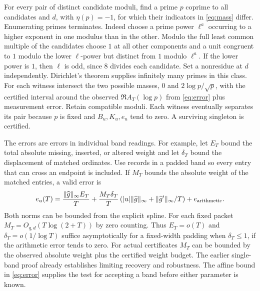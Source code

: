 \documentclass[11pt]{article}
\begin{document}
For every pair of distinct candidate moduli, find a prime $p$ coprime to
all candidates and $d$, with $\eta(p)=-1$, for which their
indicators in \eqref{eq:mass} differ. Enumerating primes terminates.
Indeed choose a prime power $\ell^a$ occurring to a higher exponent in one
modulus than in the other. Modulo the full least common multiple of the
candidates choose $1$ at all other components and a unit congruent to $1$
modulo the lower $\ell$-power but distinct from $1$ modulo $\ell^a$.
If the lower power is $1$, then $\ell$ is odd, since $8$ divides each
candidate. Set a nonresidue at $d$ independently. Dirichlet's theorem
supplies infinitely many primes in this class.
For each witness intersect the two possible masses, $0$ and
$2\log p/\sqrt p$, with the certified interval around the observed
$\Re A_T(\log p)$ from \eqref{eq:error} plus measurement error. Retain
compatible moduli. Each witness eventually separates its pair because $p$
is fixed and $B_u,K_u,e_u$ tend to zero. A surviving singleton is certified.

The errors are errors in individual band readings. For example, let
$E_T$ bound the total absolute missing, inserted, or altered weight and
let $\delta_T$ bound the displacement of matched ordinates. Use records
in a padded band so every entry that can cross an endpoint is included.
If $M_T$ bounds the absolute weight of the matched entries, a valid error is
\[
 e_u(T)=\frac{\|\widehat g\|_\infty E_T}{T}
 +\frac{M_T\delta_T}{T}
 \left(|u|\|\widehat g\|_\infty+\|\widehat g'\|_\infty/T\right)
 +e_{\rm arithmetic}.
\]
Both norms can be bounded from the explicit spline. For each fixed packet
$M_T=O_{q,d}(T\log(2+T))$ by zero counting. Thus
$E_T=o(T)$ and $\delta_T=o(1/\log T)$ suffice asymptotically for a
fixed-width padding when $\delta_T\le1$, if the
arithmetic error tends to zero. For actual certificates $M_T$ can be
bounded by the observed absolute weight plus the certified weight budget.
The earlier single-band proof already establishes limiting recovery
and robustness. The affine bound in \eqref{eq:error} supplies the
test for accepting a band before either parameter is known.
\end{document}
